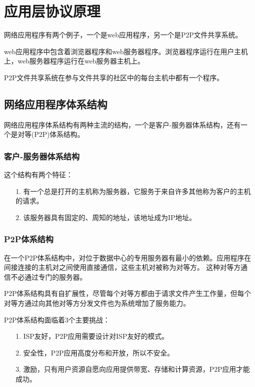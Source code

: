 \documentclass[a4paper,left=2.5cm,right=2.5cm,11pt]{article}
\begin{document}

\section{应用层协议原理}
	网络应用程序有两个例子，一个是web应用程序，另一个是P2P文件共享系统。\par

	web应用程序中包含着浏览器程序和web服务器程序。浏览器程序运行在用户主机上，web服务器程序运行在web服务器主机上。\par

	P2P文件共享系统在参与文件共享的社区中的每台主机中都有一个程序。

\subsection{网络应用程序体系结构}
	网络应用程序体系结构有两种主流的结构，一个是客户-服务器体系结构，还有一个是对等(P2P)体系结构。\par

\subsubsection{客户-服务器体系结构}
	这个结构有两个特征：
	\begin{itemize}
		\item[1.] 有一个总是打开的主机称为服务器，它服务于来自许多其他称为客户的主机的请求。
		\item[2.] 该服务器具有固定的、周知的地址，该地址成为IP地址。
	\end{itemize}

\subsubsection{P2P体系结构}
	在一个P2P体系结构中，对位于数据中心的专用服务器有最小的依赖。应用程序在间接连接的主机对之间使用直接通信，这些主机对被称为对等方。
	这种对等方通信不必通过专门的服务器。\par

	P2P体系结构具有自扩展性，尽管每个对等方都由于请求文件产生工作量，但每个对等方通过向其他对等方分发文件也为系统增加了服务能力。\par

	P2P体系结构面临着3个主要挑战：
	\begin{itemize}
		\item[1.] ISP友好，P2P应用需要设计对ISP友好的模式。
		\item[2.] 安全性，P2P应用高度分布和开放，所以不安全。
		\item[3.] 激励，只有用户资源自愿向应用提供带宽、存储和计算资源，P2P应用才能成功。
	\end{itemize}
\end{document}
